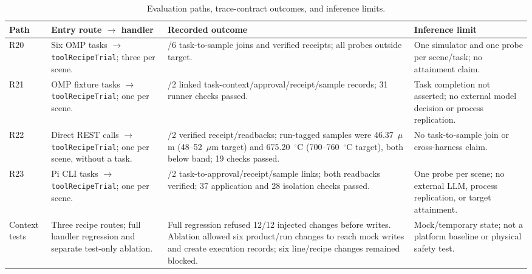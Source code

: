 \FloatBarrier
\begin{table}[!t]
\centering
\caption{Evaluation paths, trace-contract outcomes, and inference limits.}
\label{tab:routes}
\small
\setlength{\tabcolsep}{4pt}
\begin{tabularx}{\textwidth}{@{}>{\raggedright\arraybackslash}p{1.25cm}>{\raggedright\arraybackslash}p{3.4cm}>{\raggedright\arraybackslash}X>{\raggedright\arraybackslash}p{4.0cm}@{}}
\toprule
Path & Entry route $\rightarrow$ handler & Recorded outcome & Inference limit \\
\midrule
R20 & Six OMP tasks $\rightarrow$ \texttt{toolRecipeTrial}; three per scene. & 6/6 task-to-sample joins and verified receipts; all probes outside target. & One simulator and one probe per scene/task; no attainment claim. \\
R21 & OMP fixture tasks $\rightarrow$ \texttt{toolRecipeTrial}; one per scene. & 2/2 linked task-context/approval/receipt/sample records; 31 runner checks passed. & Task completion not asserted; no external model decision or process replication. \\
R22 & Direct REST calls $\rightarrow$ \texttt{toolRecipeTrial}; one per scene, without a task. & 2/2 verified receipt/readbacks; run-tagged samples were 46.37~$\mu$m (48--52~$\mu$m target) and 675.20~$^{\circ}$C (700--760~$^{\circ}$C target), both below band; 19 checks passed. & No task-to-sample join or cross-harness claim. \\
R23 & Pi CLI tasks $\rightarrow$ \texttt{toolRecipeTrial}; one per scene. & 2/2 task-to-approval/receipt/sample links; both readbacks verified; 37 application and 28 isolation checks passed. & One probe per scene; no external LLM, process replication, or target attainment. \\
Context tests & Three recipe routes; full handler regression and separate test-only ablation. & Full regression refused 12/12 injected changes before writes. Ablation allowed six product/run changes to reach mock writes and create execution records; six line/recipe changes remained blocked. & Mock/temporary state; not a platform baseline or physical safety test. \\
\bottomrule
\end{tabularx}
\end{table}

